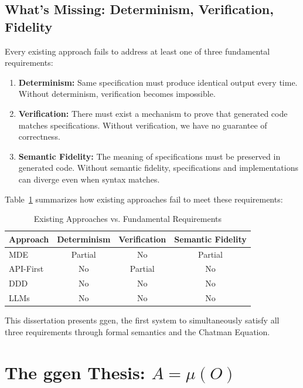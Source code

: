 \subsection{What's Missing: Determinism, Verification, Fidelity}

Every existing approach fails to address at least one of three fundamental requirements:

\begin{enumerate}
    \item \textbf{Determinism:} Same specification must produce identical output every time. Without determinism, verification becomes impossible.

    \item \textbf{Verification:} There must exist a mechanism to prove that generated code matches specifications. Without verification, we have no guarantee of correctness.

    \item \textbf{Semantic Fidelity:} The meaning of specifications must be preserved in generated code. Without semantic fidelity, specifications and implementations can diverge even when syntax matches.
\end{enumerate}

Table~\ref{tab:approach_comparison} summarizes how existing approaches fail to meet these requirements:

\begin{table}[h]
\centering
\caption{Existing Approaches vs. Fundamental Requirements}
\label{tab:approach_comparison}
\begin{tabular}{lccc}
\toprule
\textbf{Approach} & \textbf{Determinism} & \textbf{Verification} & \textbf{Semantic Fidelity} \\
\midrule
MDE & Partial & No & Partial \\
API-First & No & Partial & No \\
DDD & No & No & No \\
LLMs & No & No & No \\
\bottomrule
\end{tabular}
\end{table}

This dissertation presents ggen, the first system to simultaneously satisfy all three requirements through formal semantics and the Chatman Equation.

\section{The ggen Thesis: \(A = \mu(O)\)}


